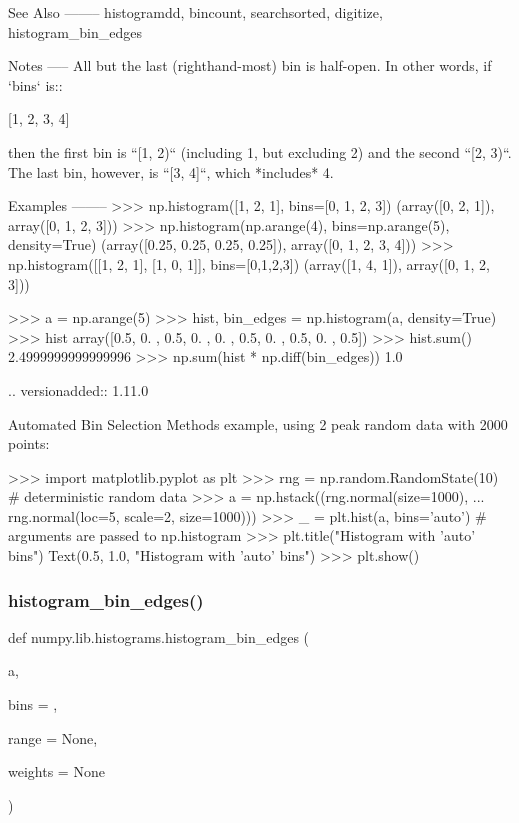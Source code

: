 \begin{DoxyVerb}
See Also
--------
histogramdd, bincount, searchsorted, digitize, histogram_bin_edges

Notes
-----
All but the last (righthand-most) bin is half-open.  In other words,
if `bins` is::

  [1, 2, 3, 4]

then the first bin is ``[1, 2)`` (including 1, but excluding 2) and
the second ``[2, 3)``.  The last bin, however, is ``[3, 4]``, which
*includes* 4.


Examples
--------
>>> np.histogram([1, 2, 1], bins=[0, 1, 2, 3])
(array([0, 2, 1]), array([0, 1, 2, 3]))
>>> np.histogram(np.arange(4), bins=np.arange(5), density=True)
(array([0.25, 0.25, 0.25, 0.25]), array([0, 1, 2, 3, 4]))
>>> np.histogram([[1, 2, 1], [1, 0, 1]], bins=[0,1,2,3])
(array([1, 4, 1]), array([0, 1, 2, 3]))

>>> a = np.arange(5)
>>> hist, bin_edges = np.histogram(a, density=True)
>>> hist
array([0.5, 0. , 0.5, 0. , 0. , 0.5, 0. , 0.5, 0. , 0.5])
>>> hist.sum()
2.4999999999999996
>>> np.sum(hist * np.diff(bin_edges))
1.0

.. versionadded:: 1.11.0

Automated Bin Selection Methods example, using 2 peak random data
with 2000 points:

>>> import matplotlib.pyplot as plt
>>> rng = np.random.RandomState(10)  # deterministic random data
>>> a = np.hstack((rng.normal(size=1000),
...                rng.normal(loc=5, scale=2, size=1000)))
>>> _ = plt.hist(a, bins='auto')  # arguments are passed to np.histogram
>>> plt.title("Histogram with 'auto' bins")
Text(0.5, 1.0, "Histogram with 'auto' bins")
>>> plt.show()\end{DoxyVerb}
 \mbox{\label{namespacenumpy_1_1lib_1_1histograms_ad32f0380d0c7e28fcc2c8a8ad9667a20}} 
\subsubsection{\texorpdfstring{histogram\+\_\+bin\+\_\+edges()}{histogram\_bin\_edges()}}
{\footnotesize\ttfamily def numpy.\+lib.\+histograms.\+histogram\+\_\+bin\+\_\+edges (\begin{DoxyParamCaption}\item[{}]{a,  }\item[{}]{bins = {},  }\item[{}]{range = {\ttfamily None},  }\item[{}]{weights = {\ttfamily None} }\end{DoxyParamCaption})}

